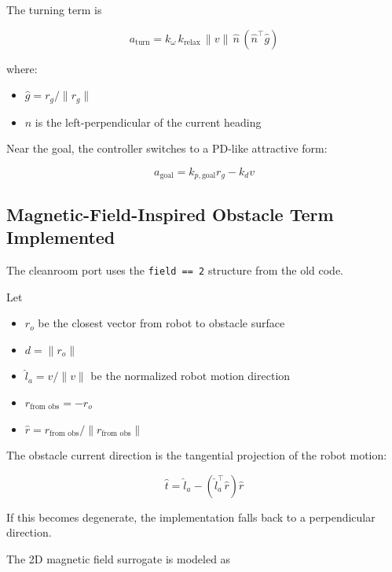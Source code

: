 \documentclass[11pt]{article}
\begin{document}
The turning term is

\begin{equation}
a_{\text{turn}}
=
k_{\omega}\,k_{\text{relax}}\,\lVert v \rVert\,\hat{n}\,(\hat{n}^\top \hat{g})
\end{equation}

where:

\begin{itemize}[leftmargin=*]
  \item $\hat{g} = r_g / \lVert r_g \rVert$
  \item $\hat{n}$ is the left-perpendicular of the current heading
\end{itemize}

Near the goal, the controller switches to a PD-like attractive form:

\begin{equation}
a_{\text{goal}}
=
k_{p,\text{goal}} r_g - k_d v
\end{equation}

\subsection*{Magnetic-Field-Inspired Obstacle Term Implemented}

The cleanroom port uses the \texttt{field == 2} structure from the old code.

Let
\begin{itemize}[leftmargin=*]
  \item $r_o$ be the closest vector from robot to obstacle surface
  \item $d = \lVert r_o \rVert$
  \item $\hat{l}_a = v / \lVert v \rVert$ be the normalized robot motion direction
  \item $r_{\text{from obs}} = -r_o$
  \item $\hat{r} = r_{\text{from obs}} / \lVert r_{\text{from obs}} \rVert$
\end{itemize}

The obstacle current direction is the tangential projection of the robot motion:

\begin{equation}
\hat{t}
=
\hat{l}_a - (\hat{l}_a^\top \hat{r})\hat{r}
\end{equation}

If this becomes degenerate, the implementation falls back to a perpendicular
direction.

The 2D magnetic field surrogate is modeled as
\end{document}
